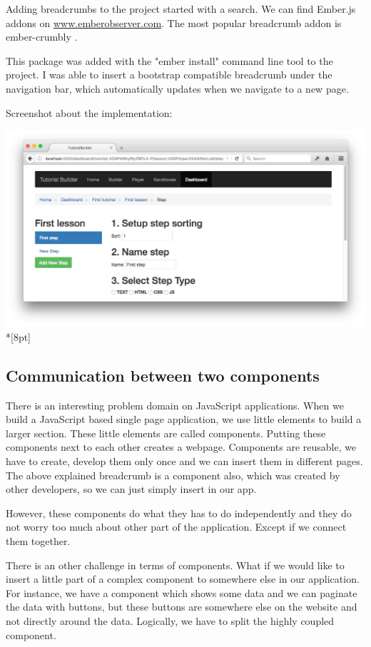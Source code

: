 \documentclass[12pt, a4paper, oneside, openright, medskipamount]{report}
\begin{document}
Adding breadcrumbs to the project started with a search. We can find Ember.js addons on \url{www.emberobserver.com}. The most popular breadcrumb addon is ember-crumbly \cite{ember-crumbly}.

This package was added with the "ember install" command line tool to the project. I was able to insert a bootstrap compatible breadcrumb under the navigation bar, which automatically updates when we navigate to a new page.

Screenshot about the implementation:

\includegraphics[width=1\textwidth]{assets/breadcrumb-screenshot.png}\\*[8pt]

\subsection{Communication between two components}

There is an interesting problem domain on JavaScript applications. When we build a JavaScript based single page application, we use little elements to build a larger section. These little elements are called components. Putting these components next to each other creates a webpage. Components are reusable, we have to create, develop them only once and we can insert them in different pages. The above explained breadcrumb is a component also, which was created by other developers, so we can just simply insert in our app.

However, these components do what they has to do independently and they do not worry too much about other part of the application. Except if we connect them together.

There is an other challenge in terms of components. What if we would like to insert a little part of a complex component to somewhere else in our application. For instance, we have a component which shows some data and we can paginate the data with buttons, but these buttons are somewhere else on the website and not directly around the data. Logically, we have to split the highly coupled component.
\end{document}
